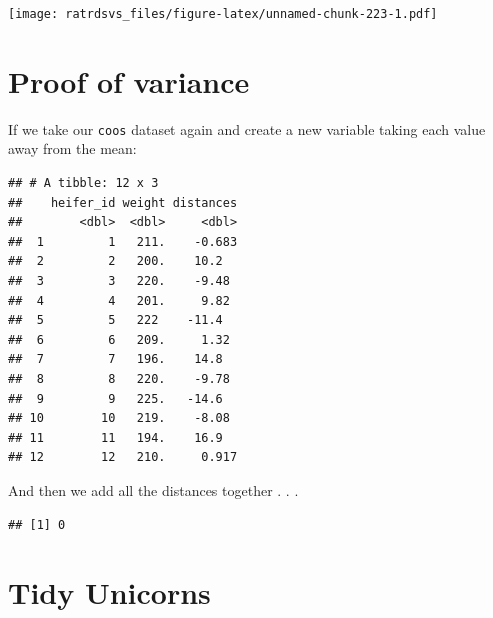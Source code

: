 \documentclass[
]{book}
\newenvironment{Shaded}{\begin{snugshade}}{\end{snugshade}}
\newcommand{\DataTypeTok}[1]{\textcolor[rgb]{0.13,0.29,0.53}{#1}}
\newcommand{\DecValTok}[1]{\textcolor[rgb]{0.00,0.00,0.81}{#1}}
\newcommand{\KeywordTok}[1]{\textcolor[rgb]{0.13,0.29,0.53}{\textbf{#1}}}
\newcommand{\NormalTok}[1]{#1}
\newcommand{\OperatorTok}[1]{\textcolor[rgb]{0.81,0.36,0.00}{\textbf{#1}}}
\newcommand{\StringTok}[1]{\textcolor[rgb]{0.31,0.60,0.02}{#1}}
\begin{document}
\texttt{[image: ratrdsvs\_files/figure-latex/unnamed-chunk-223-1.pdf]}

\hypertarget{stats_proofvariance}{%
\section{Proof of variance}\label{stats_proofvariance}}

If we take our \texttt{coos} dataset again and create a new variable taking each value away from the mean:

\begin{Shaded}
\end{Shaded}

\begin{verbatim}
## # A tibble: 12 x 3
##    heifer_id weight distances
##        <dbl>  <dbl>     <dbl>
##  1         1   211.    -0.683
##  2         2   200.    10.2  
##  3         3   220.    -9.48 
##  4         4   201.     9.82 
##  5         5   222    -11.4  
##  6         6   209.     1.32 
##  7         7   196.    14.8  
##  8         8   220.    -9.78 
##  9         9   225.   -14.6  
## 10        10   219.    -8.08 
## 11        11   194.    16.9  
## 12        12   210.     0.917
\end{verbatim}

And then we add all the distances together . . .

\begin{Shaded}
\end{Shaded}

\begin{verbatim}
## [1] 0
\end{verbatim}

\hypertarget{ans_tidyunicorns}{%
\section{Tidy Unicorns}\label{ans_tidyunicorns}}
\end{document}
